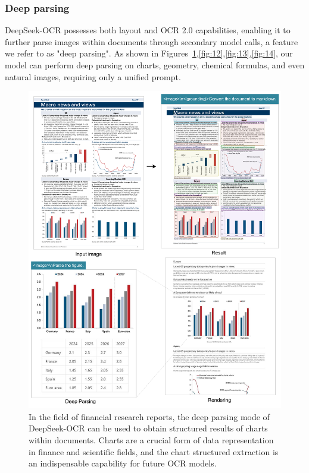 \documentclass[11pt, a4paper, logo, copyright, nonumbering]{deepseek}
\begin{document}
\begin{CJK*}{UTF8}{gbsn}

\subsubsection{Deep parsing}
DeepSeek-OCR possesses both layout and OCR 2.0 capabilities, enabling it to further parse images within documents through secondary model calls, a feature we refer to as "deep parsing". As shown in Figures~\ref{fig:11},\ref{fig:12},\ref{fig:13},\ref{fig:14}, our model can perform deep parsing on charts, geometry, chemical formulas, and even natural images, requiring only a unified prompt.

\begin{figure}[p]
	\centering
    \includegraphics[width=1.0\linewidth]{figures/5.pdf}
	\caption{In the field of financial research reports, the deep parsing mode of DeepSeek-OCR can be used to obtain structured  results of charts within documents. Charts are a crucial form of data representation in finance and scientific fields, and the chart structured extraction is an indispensable capability for future OCR models.}
	\label{fig:11}
\end{figure}


\end{CJK*}
\end{document}

